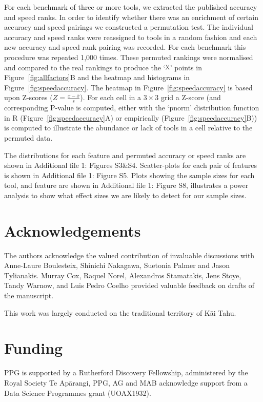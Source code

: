 \documentclass{bmcart}
\begin{document}
{For each benchmark of three or more tools, we extracted the published
accuracy and speed ranks. In order to identify whether there was an
enrichment of certain accuracy and speed pairings we constructed a
permutation test. The individual accuracy and speed ranks were
reassigned to tools in a random fashion and each new accuracy and
speed rank pairing was recorded. For each benchmark this procedure was
repeated 1,000 times. These permuted rankings were normalised and
compared to the real rankings to produce the ‘$\vartimes$’ points in
Figure~\ref{fig:allfactors}B and the heatmap and histograms in
Figure~\ref{fig:speedaccuracy}. The heatmap in
Figure~\ref{fig:speedaccuracy} is based upon Z-scores
($Z=\frac{x-\bar{x}}{s}$). For each cell in a $3\times 3$ grid
a Z-score (and corresponding P-value is computed, either with the `pnorm' distribution function in R (Figure~\ref{fig:speedaccuracy}A) or empirically (Figure~\ref{fig:speedaccuracy}B)) is computed to illustrate the abundance or lack of tools in
a cell relative to the permuted data.

{\color{red} The distributions for each feature and permuted accuracy or speed ranks are shown in {\color{red} Additional file 1: Figures S3\&S4}. Scatter-plots for each pair of features is shown in {\color{red} Additional file 1: Figure S5}. Plots showing the sample sizes for each tool, and feature are shown in {\color{red} Additional file 1: Figure S8}, illustrates a power analysis to show what effect sizes we are likely to detect for our sample sizes. }

\begin{backmatter}

\section*{Acknowledgements}
The authors acknowledge the valued contribution of invaluable
discussions with Anne-Laure Boulesteix, Shinichi Nakagawa, Suetonia
Palmer and Jason Tylianakis. Murray Cox, Raquel
Norel, Alexandros Stamatakis, Jens Stoye, Tandy Warnow, and 
Luis Pedro Coelho provided
valuable feedback on drafts of the manuscript.

This work was largely conducted on the traditional territory of K\=ai Tahu.

\section*{Funding}
PPG is supported by a Rutherford Discovery Fellowship,
administered by the Royal Society Te Ap\=arangi, 
PPG, AG and MAB acknowledge support from a Data Science Programmes grant
(UOAX1932).


\end{backmatter}}
\end{document}
